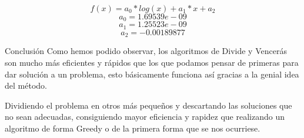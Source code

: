 \documentclass[12pt]{beamer}
\begin{document}
\begin{frame}
\[
f(x)=a_0*log(x)+a_1*x+a_2
\]
\[
a_0=1.69539e-09
\]
\[
a_1=1.25523e-09
\]
\[
a_2=-0.00189877
\]
\end{frame}

\begin{frame}{Conclusión}
Como hemos podido observar, los algoritmos de Divide y Vencerás son mucho más eficientes y rápidos que los que podamos pensar de primeras para dar solución a un problema, esto básicamente funciona así gracias a la genial idea del método. 

\vspace{5mm} %

Dividiendo el problema en otros más pequeños y descartando las soluciones que no sean adecuadas, consiguiendo mayor eficiencia y rapidez que realizando un algoritmo de forma Greedy o de la primera forma que se nos ocurriese.
\end{frame}
\end{document}
